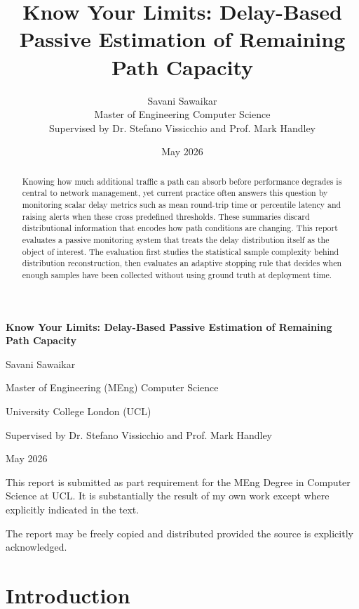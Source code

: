 \documentclass[a4paper,11pt]{report}
\title{Know Your Limits: Delay-Based Passive Estimation of Remaining Path Capacity}
\date{May 2026}
\author{Savani Sawaikar\\
Master of Engineering Computer Science\\
Supervised by Dr. Stefano Vissicchio and Prof. Mark Handley}
\begin{document}
\onehalfspacing
{}

\begin{titlepage}
\centering
\vspace*{2cm}
{\Large\bfseries Know Your Limits: Delay-Based Passive Estimation of Remaining Path Capacity\par}
\vspace{1.5cm}
{\large Savani Sawaikar\par}
\vspace{0.5cm}
{Master of Engineering (MEng) Computer Science\par}
{University College London (UCL)\par}
\vspace{0.5cm}
{Supervised by Dr. Stefano Vissicchio and Prof. Mark Handley\par}
\vspace{0.5cm}
{May 2026\par}
\vfill
\begin{minipage}{0.9\textwidth}
\small
This report is submitted as part requirement for the MEng Degree in Computer Science at UCL. It is substantially the result of my own work except where explicitly indicated in the text.

The report may be freely copied and distributed provided the source is explicitly acknowledged.
\end{minipage}
\end{titlepage}

\begin{abstract}
Knowing how much additional traffic a path can absorb before performance degrades is central to network management, yet current practice often answers this question by monitoring scalar delay metrics such as mean round-trip time or percentile latency and raising alerts when these cross predefined thresholds. These summaries discard distributional information that encodes how path conditions are changing. This report evaluates a passive monitoring system that treats the delay distribution itself as the object of interest. The evaluation first studies the statistical sample complexity behind distribution reconstruction, then evaluates an adaptive stopping rule that decides when enough samples have been collected without using ground truth at deployment time.
\end{abstract}

\clearpage
{}
\setcounter{page}{1}
\tableofcontents

\chapter{Introduction}
\end{document}
